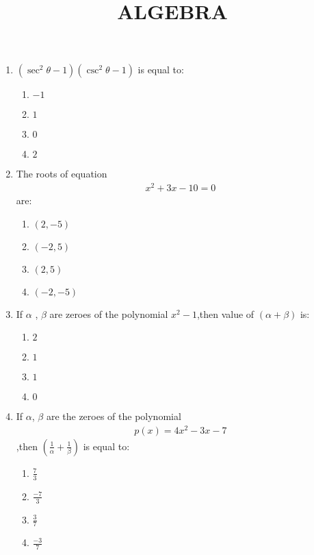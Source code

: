 \documentclass{article}
\providecommand{\brak}[1]{\ensuremath{\left(#1\right)}}
\begin{document}
\begin{center}
\title{ ALGEBRA}
\date{}
\maketitle  
\end{center}
\begin{enumerate}
    \item $\brak{\sec^2\theta - 1}\brak{\csc^2\theta - 1}$  is equal to:
    \begin{enumerate}
        \item $-1$
        \item  $1$
        \item  $0$
        \item  $2$
        \end{enumerate}
    \item The roots of equation 
    \begin{align}
        x^2 + 3x - 10 = 0
    \end{align}
    are:
    \begin{enumerate}
        \item $\brak{2,-5}$
        \item $\brak{-2,5}$
        \item $\brak{2,5}$
        \item $\brak{-2,-5}$
    \end{enumerate}
    \item If $\alpha$ , $\beta$ are zeroes of the polynomial $x^2-1$,then value of $\brak{\alpha+\beta}$ is:
    \begin{enumerate}
        \item $2$
        \item $1$
        \item $1$
        \item $0$
    \end{enumerate}
    \pagebreak
   \item  If $\alpha$, $\beta$ are the zeroes of the polynomial
   \begin{align}
       p(x)=4x^2 - 3x -7
   \end{align}
   ,then $\brak{\frac{1}{\alpha}+\frac{1}{\beta}}$ is equal to:
   \begin{enumerate}
       \item $\frac{7}{3}$
       \item $\frac{-7}{3}$
       \item $\frac{3}{7}$
       \item $\frac{-3}{7}$

\end{enumerate}
\end{enumerate}
\end{document}

